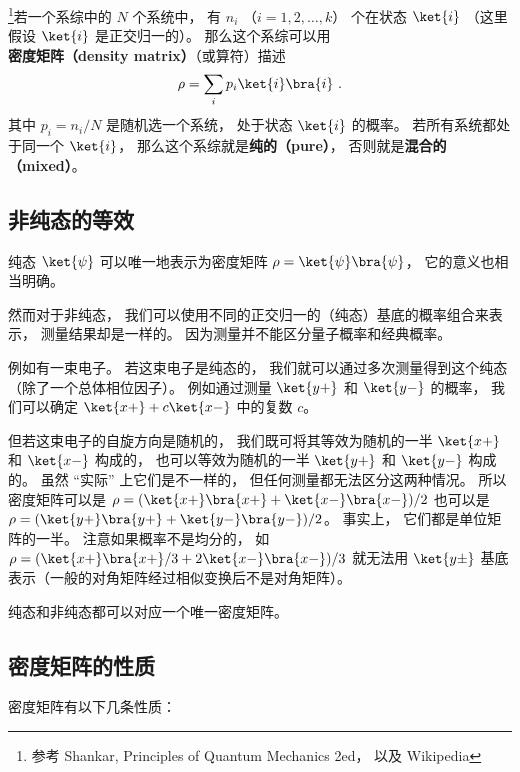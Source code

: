 

\footnote{参考 Shankar, Principles of Quantum Mechanics 2ed， 以及 Wikipedia}若一个系综中的 $N$ 个系统中， 有 $n_i$ （$i = 1,2,\dots,k$） 个在状态 $\ket{i}$ （这里假设 $\ket{i}$ 是正交归一的）。 那么这个系综可以用\textbf{密度矩阵（density matrix）}（或算符）描述
\begin{equation}\label{eq_denMat_1}
\rho = \sum_i p_i\ket{i}\bra{i}   ~.
\end{equation}
其中 $p_i = n_i/N$ 是随机选一个系统， 处于状态 $\ket{i}$ 的概率。 若所有系统都处于同一个 $\ket{i}$， 那么这个系综就是\textbf{纯的（pure）}， 否则就是\textbf{混合的（mixed）}。

\subsection{非纯态的等效}
纯态 $\ket{\psi}$ 可以唯一地表示为密度矩阵 $\rho = \ket{\psi}\bra{\psi}$， 它的意义也相当明确。

然而对于非纯态， 我们可以使用不同的正交归一的（纯态）基底的概率组合来表示， 测量结果却是一样的。 因为测量并不能区分量子概率和经典概率。

例如有一束电子。 若这束电子是纯态的， 我们就可以通过多次测量得到这个纯态（除了一个总体相位因子）。 例如通过测量 $\ket{y+}$ 和 $\ket{y-}$ 的概率， 我们可以确定 $\ket{x+} + c\ket{x-}$ 中的复数 $c$。

但若这束电子的自旋方向是随机的， 我们既可将其等效为随机的一半 $\ket{x+}$ 和 $\ket{x-}$ 构成的， 也可以等效为随机的一半 $\ket{y+}$ 和 $\ket{y-}$ 构成的。 虽然 “实际” 上它们是不一样的， 但任何测量都无法区分这两种情况。 所以密度矩阵可以是 $\rho = (\ket{x+}\bra{x+} + \ket{x-}\bra{x-})/2$ 也可以是 $\rho = (\ket{y+}\bra{y+} + \ket{y-}\bra{y-})/2$。 事实上， 它们都是单位矩阵的一半。 注意如果概率不是均分的， 如 $\rho = (\ket{x+}\bra{x+}/3 + 2\ket{x-}\bra{x-})/3$ 就无法用 $\ket{y\pm}$ 基底表示（一般的对角矩阵经过相似变换后不是对角矩阵）。

纯态和非纯态都可以对应一个唯一密度矩阵。

\subsection{密度矩阵的性质}

密度矩阵有以下几条性质：

